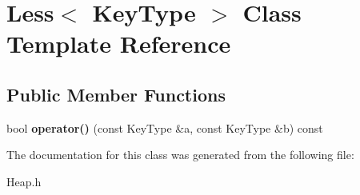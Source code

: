 \hypertarget{class_less}{\section{Less$<$ Key\+Type $>$ Class Template Reference}
\label{class_less}
}
\subsection*{Public Member Functions}
\begin{DoxyCompactItemize}
\item 
\hypertarget{class_less_afee76a5248eb9c6c8fd1f005360d44d5}{bool {\bfseries operator()} (const Key\+Type \&a, const Key\+Type \&b) const }\label{class_less_afee76a5248eb9c6c8fd1f005360d44d5}

\end{DoxyCompactItemize}


The documentation for this class was generated from the following file\+:\begin{DoxyCompactItemize}
\item 
Heap.\+h\end{DoxyCompactItemize}
